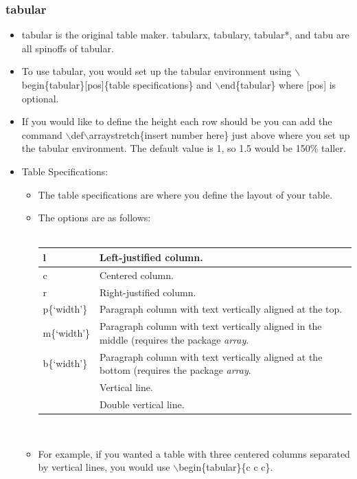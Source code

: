 		\subsubsection{tabular}
			\begin{itemize}
				\item tabular is the original table maker. tabularx, tabulary, tabular*, and tabu are all spinoffs of tabular.
				\item To use tabular, you would set up the tabular environment using $\backslash$begin\{tabular\}[pos]\{table specifications\} and $\backslash$end\{tabular\} where [pos] is optional.
				\item If you would like to define the height each row should be you can add the command $\backslash$def$\backslash$arraystretch\{insert number here\} just above where you set up the tabular environment. The default value is 1, so 1.5 would be 150\% taller.
				\item Table Specifications:
				\begin{itemize}
					\item The table specifications are where you define the layout of your table.
					\item The options are as follows:\\\\
					\def\arraystretch{1.4}
					\begin{tabularx}{\textwidth}{| l | X |}
						\hline
						l & Left-justified column.\\
						\hline
						c & Centered column.\\
						\hline
						r & Right-justified column.\\
						\hline
						p\{\lq{}width\rq{}\} & Paragraph column with text vertically aligned at the top.\\
						\hline
						m\{\lq{}width\rq{}\} & Paragraph column with text vertically aligned in the middle (requires the package \textit{array}.\\
						\hline
						b\{\lq{}width\rq{}\} & Paragraph column with text vertically aligned at the bottom (requires the package \textit{array}.\\
						\hline
						\textbar & Vertical line.\\
						\hline
						\textbar\textbar & Double vertical line.\\
						\hline
					\end{tabularx}\\
					\item For example, if you wanted a table with three centered columns separated by vertical lines, you would use $\backslash$begin\{tabular\}\{c \textbar{} c \textbar{} c\}.

\end{itemize}
\end{itemize}
